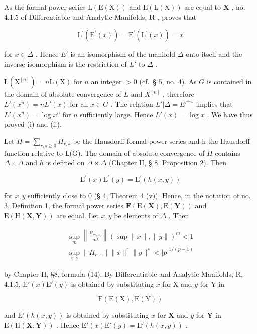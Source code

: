 As the formal power series \(\mathrm{L}(\mathrm{E}(\mathrm{X}))\) and \(\mathrm{E}(\mathrm{L}(\mathrm{X}))\) are equal to \(\mathbf{X}\) , no. 4.1.5 of Differentiable and Analytic Manifolds, \(\mathbf{R}\) , proves that

\[
\mathrm{L} ^ {\prime} (\mathrm{E} ^ {\prime} (x)) = \mathrm{E} ^ {\prime} (\mathrm{L} ^ {\prime} (x)) = x
\]

for \(x \in \Delta\) . Hence \(E'\) is an isomorphism of the manifold \(\Delta\) onto itself and the inverse isomorphism is the restriction of \(L'\) to \(\Delta\) .

\(\mathrm{L}(\mathrm{X}^{[n]}) = n\tilde{\mathrm{L}}(\mathrm{X})\) for \(n\) an integer \(> 0\) (cf.~§ 5, no. 4). As \(G\) is contained in the domain of absolute convergence of \(L\) and \(X^{[n]}\) , therefore \(L'(x^n) = nL'(x)\) for all \(x \in G\) . The relation \(L'| \Delta = E'^{-1}\) implies that \(L'(x^n) = \log x^n\) for \(n\) sufficiently large. Hence \(L'(x) = \log x\) . We have thus proved (i) and (ii).

Let \(H = \sum_{r,s \geq 0} H_{r,s}\) be the Hausdorff formal power series and h the Hausdorff function relative to L(G). The domain of absolute convergence of \(\tilde{H}\) contains \(\Delta \times \Delta\) and \(h\) is defined on \(\Delta \times \Delta\) (Chapter II, § 8, Proposition 2). Then

\[
\mathrm{E} ^ {\prime} (x) \mathrm{E} ^ {\prime} (y) = \mathrm{E} ^ {\prime} (h (x, y))
\]

for \(x, y\) sufficiently close to 0 (§ 4, Theorem 4 (v)). Hence, in the notation of no. 3, Definition 1, the formal power series \(\mathbf{F}(\mathrm{E}(\mathbf{X}), \mathrm{E}(\mathbf{Y}))\) and \(\mathrm{E}(\mathrm{H}(\mathbf{X}, \mathbf{Y}))\) are equal. Let \(x, y\) be elements of \(\Delta\) . Then

\[
\begin{array}{l} \sup _ {m} \left\| \frac {\psi_ {m , m}}{m !} \right\| (\sup \| x \|, \| y \|) ^ {m} <   1 \\ \sup _ {r, s} \| H _ {r, s} \| \| x \| ^ {r} \| y \| ^ {s} <   | p | ^ {1 / (p - 1)} \end{array}
\]

by Chapter II, §8, formula (14). By Differentiable and Analytic Manifolds, R, 4.1.5, \(\mathrm{E}'(x)\mathrm{E}'(y)\) is obtained by substituting \(x\) for X and \(y\) for Y in

\[
\mathrm{F} (\mathrm{E} (\mathrm{X}), \mathrm{E} (\mathrm{Y}))
\]

and \(\mathrm{E}'(h(x,y))\) is obtained by substituting \(x\) for \(\mathbf{X}\) and \(y\) for \(\mathbf{Y}\) in \(\mathrm{E}(\mathrm{H}(\mathbf{X},\mathbf{Y}))\) . Hence \(\mathrm{E}'(x)\mathrm{E}'(y) = \mathrm{E}'(h(x,y))\) .

